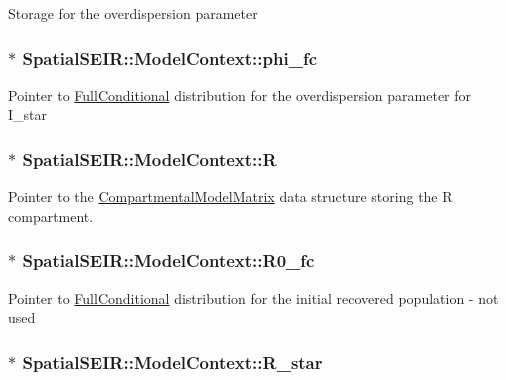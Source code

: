 Storage for the overdispersion parameter \hypertarget{classSpatialSEIR_1_1ModelContext_a97d54a9e4778575b5c88264f88831fc4}{
\subsubsection[{phi\-\_\-fc}]{$\ast$ Spatial\-S\-E\-I\-R\-::\-Model\-Context\-::phi\-\_\-fc}}\label{classSpatialSEIR_1_1ModelContext_a97d54a9e4778575b5c88264f88831fc4}
Pointer to \hyperlink{classSpatialSEIR_1_1FullConditional}{Full\-Conditional} distribution for the overdispersion parameter for I\-\_\-star \hypertarget{classSpatialSEIR_1_1ModelContext_a97ad90554c0f23cc4137661285df3213}{
\subsubsection[{R}]{$\ast$ Spatial\-S\-E\-I\-R\-::\-Model\-Context\-::\-R}}\label{classSpatialSEIR_1_1ModelContext_a97ad90554c0f23cc4137661285df3213}
Pointer to the \hyperlink{classSpatialSEIR_1_1CompartmentalModelMatrix}{Compartmental\-Model\-Matrix} data structure storing the R compartment. \hypertarget{classSpatialSEIR_1_1ModelContext_a080fbc05c16a279300a4b1f7957592f8}{
\subsubsection[{R0\-\_\-fc}]{$\ast$ Spatial\-S\-E\-I\-R\-::\-Model\-Context\-::\-R0\-\_\-fc}}\label{classSpatialSEIR_1_1ModelContext_a080fbc05c16a279300a4b1f7957592f8}
Pointer to \hyperlink{classSpatialSEIR_1_1FullConditional}{Full\-Conditional} distribution for the initial recovered population -\/ not used \hypertarget{classSpatialSEIR_1_1ModelContext_a03a86c851b58cf707ed0e0f734f01780}{
\subsubsection[{R\-\_\-star}]{$\ast$ Spatial\-S\-E\-I\-R\-::\-Model\-Context\-::\-R\-\_\-star}}\label{classSpatialSEIR_1_1ModelContext_a03a86c851b58cf707ed0e0f734f01780}

